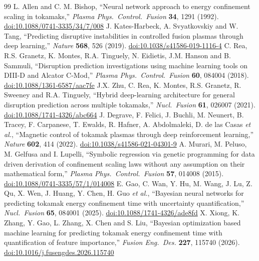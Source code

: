 \documentclass[aip,pop,preprint,amsmath,amssymb]{revtex4-2}
\begin{document}
\begin{thebibliography}{99}
 L. Allen and C. M. Bishop, ``Neural network approach to energy
confinement scaling in tokamaks,'' \emph{Plasma Phys.\ Control.\ Fusion}
\textbf{34}, 1291 (1992).
\href{https://doi.org/10.1088/0741-3335/34/7/008}{doi:10.1088/0741-3335/34/7/008}
 J. Kates-Harbeck, A. Svyatkovskiy and W. Tang,
``Predicting disruptive instabilities in controlled fusion plasmas through deep
learning,'' \emph{Nature} \textbf{568}, 526 (2019).
\href{https://doi.org/10.1038/s41586-019-1116-4}{doi:10.1038/s41586-019-1116-4}
 C. Rea, R.S. Granetz, K. Montes, R.A. Tinguely, N. Eidietis,
J.M. Hanson and B. Sammuli, ``Disruption prediction investigations using machine
learning tools on DIII-D and Alcator C-Mod,'' \emph{Plasma Phys.\ Control.\
Fusion} \textbf{60}, 084004 (2018).
\href{https://doi.org/10.1088/1361-6587/aac7fe}{doi:10.1088/1361-6587/aac7fe}
\bibitem{zhu} J.X. Zhu, C. Rea, K. Montes, R.S. Granetz, R. Sweeney and R.A. Tinguely,
``Hybrid deep-learning architecture for
general disruption prediction across multiple tokamaks,'' \emph{Nucl.\ Fusion}
\textbf{61}, 026007 (2021).
\href{https://doi.org/10.1088/1741-4326/abc664}{doi:10.1088/1741-4326/abc664}
\bibitem{degrave} J. Degrave, F. Felici, J. Buchli, M. Neunert, B. Tracey, F. Carpanese,
T. Ewalds, R. Hafner, A. Abdolmaleki, D. de las Casas \emph{et al.},
``Magnetic control of tokamak
plasmas through deep reinforcement learning,'' \emph{Nature} \textbf{602}, 414
(2022).
\href{https://doi.org/10.1038/s41586-021-04301-9}{doi:10.1038/s41586-021-04301-9}
\bibitem{murari} A. Murari, M. Peluso, M. Gelfusa and I. Lupelli, ``Symbolic
regression via genetic programming for data driven derivation of confinement
scaling laws without any assumption on their mathematical form,''
\emph{Plasma Phys.\ Control.\ Fusion} \textbf{57}, 014008 (2015).
\href{https://doi.org/10.1088/0741-3335/57/1/014008}{doi:10.1088/0741-3335/57/1/014008}
\bibitem{gao} E. Gao, C. Wan, Y. Hu, M. Wang, J. Lu, Z. Qu, X. Wen, J. Huang, Y. Chen,
H. Guo \emph{et al.}, ``Bayesian neural networks for predicting
tokamak energy confinement time with uncertainty quantification,''
\emph{Nucl.\ Fusion} \textbf{65}, 084001 (2025).
\href{https://doi.org/10.1088/1741-4326/ade8fd}{doi:10.1088/1741-4326/ade8fd}
\bibitem{xiong} X. Xiong, K. Zhang, Y. Gao, L. Zhang, X. Chen and S. Liu,
``Bayesian optimization based machine learning for predicting tokamak energy
confinement time with quantification of feature importance,'' \emph{Fusion
Eng.\ Des.} \textbf{227}, 115740 (2026).
\href{https://doi.org/10.1016/j.fusengdes.2026.115740}{doi:10.1016/j.fusengdes.2026.115740}

\end{thebibliography}
\end{document}
